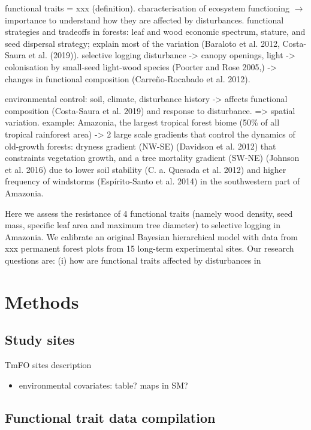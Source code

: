 \documentclass[]{elsarticle} %
\providecommand{\tightlist}{%
  \setlength{\itemsep}{0pt}\setlength{\parskip}{0pt}}
\begin{document}
functional traits = xxx (definition). characterisation of ecosystem
functioning \(\rightarrow\) importance to understand how they are
affected by disturbances. functional strategies and tradeoffs in
forests: leaf and wood economic spectrum, stature, and seed dispersal
strategy; explain most of the variation (Baraloto et al. 2012,
Costa-Saura et al. (2019)). selective logging disturbance
-\textgreater{} canopy openings, light -\textgreater{} colonisation by
small-seed light-wood species (Poorter and Rose 2005,) -\textgreater{}
changes in functional composition (Carreño-Rocabado et al. 2012).

environmental control: soil, climate, disturbance history
-\textgreater{} affects functional composition (Costa-Saura et al. 2019)
and response to disturbance. =\textgreater{} spatial variation. example:
Amazonia, the largest tropical forest biome (50\% of all tropical
rainforest area) -\textgreater{} 2 large scale gradients that control
the dynamics of old-growth forests: dryness gradient (NW-SE) (Davidson
et al. 2012) that constraints vegetation growth, and a tree mortality
gradient (SW-NE) (Johnson et al. 2016) due to lower soil stability (C.
a. Quesada et al. 2012) and higher frequency of windstorms
(Espírito-Santo et al. 2014) in the southwestern part of Amazonia.

Here we assess the resistance of 4 functional traits (namely wood
density, seed mass, specific leaf area and maximum tree diameter) to
selective logging in Amazonia. We calibrate an original Bayesian
hierarchical model with data from xxx permanent forest plots from 15
long-term experimental sites. Our research questions are: (i) how are
functional traits affected by disturbances in

\section{Methods}\label{methods}

\subsection{Study sites}\label{study-sites}

TmFO sites description

\begin{itemize}
\tightlist
\item
  environmental covariates: table? maps in SM?
\end{itemize}

\subsection{Functional trait data
compilation}\label{functional-trait-data-compilation}
\end{document}
